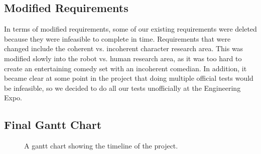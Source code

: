 
\subsection{Modified Requirements}
In terms of modified requirements, some of our existing requirements were deleted because they were infeasible to complete in time.
Requirements that were changed include the coherent vs. incoherent character research area. This was modified slowly into the robot vs. human research area, as it was too hard to create an entertaining comedy set with an incoherent comedian. In addition, it became clear at some point in the project that doing multiple official tests would be infeasible, so we decided to do all our tests unofficially at the Engineering Expo.


\pagebreak
\begin{landscape}
	\section{Final Gantt Chart}


	\begin{figure}[H]
		\scalebox{0.82}{}
		\caption{A gantt chart showing the timeline of the project.}
		\label{Gantt Chart}
	\end{figure}

\end{landscape}
\pagebreak
